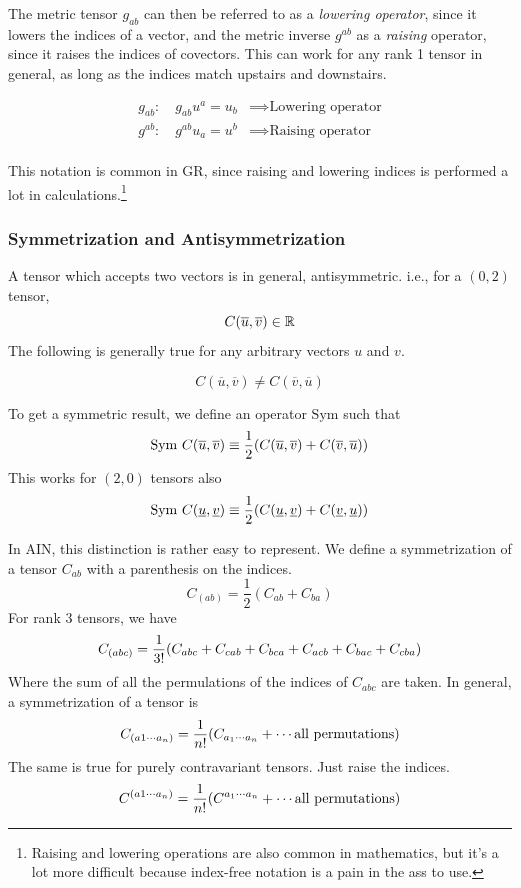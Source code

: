 		The metric tensor $g_{ab}$ can then be referred to as a \textit{lowering operator}, since it lowers
		the indices of a vector, and the metric inverse $g^{ab}$ as a \textit{raising} operator, since
		it raises the indices of covectors. This can work for any rank 1 tensor in general,
		as long as the indices match upstairs and downstairs.

		\begin{align*}
			g_{ab}:\quad g_{ab}u^a = u_b &\implies \text{Lowering operator}\\
			g^{ab}:\quad g^{ab}u_a = u^b &\implies \text{Raising operator}\\
		\end{align*}

		This notation is common in GR, since raising and lowering indices is 
		performed a lot in calculations.\footnote{Raising and lowering operations are 
		also common in mathematics, but it's a lot more difficult because index-free notation
		is a pain in the ass to use.}

	\subsubsection{Symmetrization and Antisymmetrization}
		
		A tensor which accepts two vectors is in general, antisymmetric. i.e.,
		for a $(0,2)$ tensor,
		\[
			C(\overline{u},\overline{v})\in \mathbb{R}
		\]
		The following is generally true for 
		any arbitrary vectors $u$ and $v$.

		\[
			C(\overline{u},\overline{v})\neq C(\overline{v}, \overline{u})
		\]

		To get a symmetric result, we define an operator $\mathrm{Sym}$ such that
		\begin{equation}
			\label{eq:sym-operator}
			\mathrm{Sym}\  
			C (\overline{u},\overline{v}) 
			\equiv
			\frac{1}{2}
			\pqty{
				C (\overline{u},\overline{v}) 
				+
				C (\overline{v},\overline{u}) 
			}
		\end{equation}
		This works for $(2,0)$ tensors also
		\[
			\mathrm{Sym}\  
			C (\underline{u},\underline{v}) 
			\equiv
			\frac{1}{2}
			\pqty{
				C (\underline{u},\underline{v}) 
				+
				C (\underline{v},\underline{u}) 
			}
		\]

		In AIN, this distinction is rather easy to represent. We 
		define a symmetrization of a tensor $C_{ab}$ with a parenthesis
		on the indices. 
		\begin{equation}
			\label{eq:sym-operator-AIN}
			C_{(ab)} = \frac{1}{2}(C_{ab}+C_{ba}) 
		\end{equation}
		For rank 3 tensors, we have
		\[
			C_{(abc)} = \frac{1}{3!}
			\pqty{
				C_{abc} + 
				C_{cab} + 
				C_{bca} + 
				C_{acb} + 
				C_{bac} + 
				C_{cba}  
			}
		\]
		Where the sum of all the permulations of the indices of $C_{abc}$ are taken.
		In general, a symmetrization of a tensor is
		\[
			C_{(a1\cdots a_n)} =
			\frac{1}{n!}
			\pqty{
				C_{a_1\cdots a_n} + \cdots \text{all permutations}
			}
		\]
		The same is true for purely contravariant tensors.
		Just raise the indices.
		\[
			C^{(a1\cdots a_n)} =
			\frac{1}{n!}
			\pqty{
				C^{a_1\cdots a_n} + \cdots \text{all permutations}
			}
		\]


